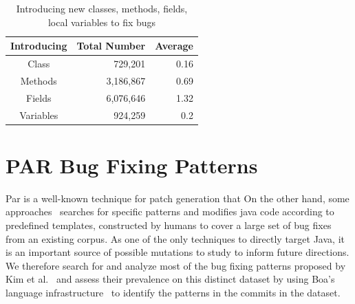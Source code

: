 \documentclass{sig-alternate-05-2015}
\newcommand{\todo}[1]
  {{\scriptsize \textbf{\color{red} {#1}}}}
\begin{document}
\begin{table}
\centering
  \begin{tabular}{| c | r | r |}
  \hline
  Introducing & Total Number & Average \\ \hline \hline
  Class & 729,201 & 0.16 \\ \hline
  Methods & 3,186,867 & 0.69 \\ \hline
  Fields & 6,076,646 & 1.32 \\ \hline
  Variables & 924,259 & 0.2 \\ \hline
  \end{tabular}
  \caption{Introducing new classes, methods, fields, local variables to fix bugs}
  \label{tbl:new}
\end{table}


\section{PAR Bug Fixing Patterns}\label{sec:method}

Par is a well-known technique for patch generation that 
On the other hand, some approaches~\cite{kim2013} searches for specific patterns
and modifies java code according to predefined templates, constructed by humans
to cover a large set of bug fixes from an existing corpus.  As one of the only
techniques to directly target Java, it is an important source of possible
mutations to study to inform future directions. 
We therefore search for and analyze most of the bug fixing patterns proposed by
Kim et al.~\cite{kim2013} and assess their prevalence on this distinct
dataset by using Boa's language infrastructure~\cite{dyer2013} to identify the patterns
in the commits in the dataset.

\end{document}

